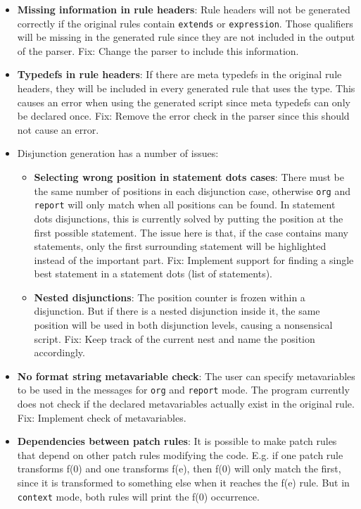 \begin{itemize}
\item \textbf{Missing information in rule headers}: Rule headers will not be generated correctly if the original rules contain \texttt{extends} or \texttt{expression}. Those qualifiers will be missing in the generated rule since they are not included in the output of the parser.\newline
Fix: Change the parser to include this information.
\item \textbf{Typedefs in rule headers}: If there are meta typedefs in the original rule headers, they will be included in every generated rule that uses the type. This causes an error when using the generated script since meta typedefs can only be declared once.\newline
Fix: Remove the error check in the parser since this should not cause an error.
\item Disjunction generation has a number of issues:
\begin{itemize}
  \item \textbf{Selecting wrong position in statement dots cases}: There must be the same number of positions in each disjunction case, otherwise \texttt{org} and \texttt{report} will only match when all positions can be found. In statement dots disjunctions, this is currently solved by putting the position at the first possible statement. The issue here is that, if the case contains many statements, only the first surrounding statement will be highlighted instead of the important part.\newline
Fix: Implement support for finding a single best statement in a statement dots (list of statements).
  \item \textbf{Nested disjunctions}: The position counter is frozen within a disjunction. But if there is a nested disjunction inside it, the same position will be used in both disjunction levels, causing a nonsensical script.\newline
Fix: Keep track of the current nest and name the position accordingly.
\end{itemize}
\item \textbf{No format string metavariable check}: The user can specify metavariables to be used in the messages for \texttt{org} and \texttt{report} mode. The program currently does not check if the declared metavariables actually exist in the original rule.\newline
Fix: Implement check of metavariables.
\item \textbf{Dependencies between patch rules}: It is possible to make patch rules that depend on other patch rules modifying the code. E.g. if one patch rule transforms f(0) and one transforms f(e), then f(0) will only match the first, since it is transformed to something else when it reaches the f(e) rule. But in \texttt{context} mode, both rules will print the f(0) occurrence.\newline

\end{itemize}
